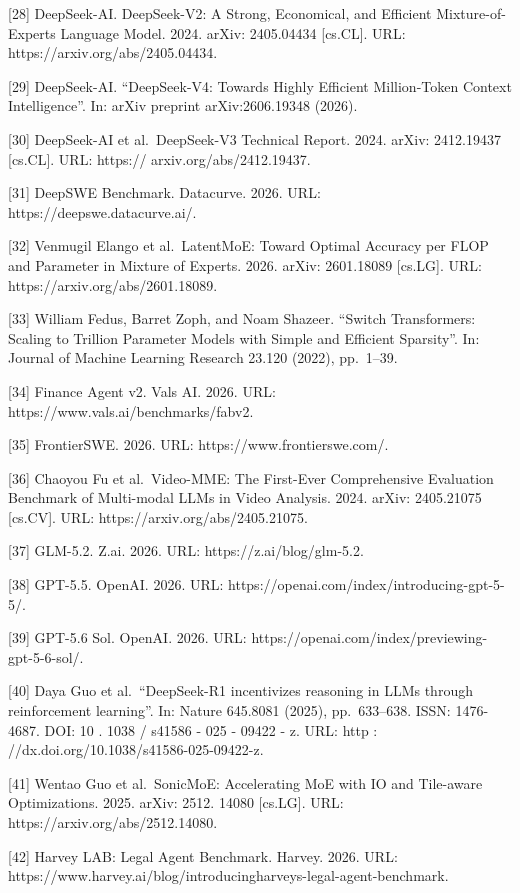 {[}28{]} DeepSeek-AI. DeepSeek-V2: A Strong, Economical, and Efficient
Mixture-of-Experts Language Model. 2024. arXiv: 2405.04434 {[}cs.CL{]}.
URL: https://arxiv.org/abs/2405.04434.

{[}29{]} DeepSeek-AI. ``DeepSeek-V4: Towards Highly Efficient
Million-Token Context Intelligence''. In: arXiv preprint
arXiv:2606.19348 (2026).

{[}30{]} DeepSeek-AI et al.~DeepSeek-V3 Technical Report. 2024. arXiv:
2412.19437 {[}cs.CL{]}. URL: https:// arxiv.org/abs/2412.19437.

{[}31{]} DeepSWE Benchmark. Datacurve. 2026. URL:
https://deepswe.datacurve.ai/.

{[}32{]} Venmugil Elango et al.~LatentMoE: Toward Optimal Accuracy per
FLOP and Parameter in Mixture of Experts. 2026. arXiv: 2601.18089
{[}cs.LG{]}. URL: https://arxiv.org/abs/2601.18089.

{[}33{]} William Fedus, Barret Zoph, and Noam Shazeer. ``Switch
Transformers: Scaling to Trillion Parameter Models with Simple and
Efficient Sparsity''. In: Journal of Machine Learning Research 23.120
(2022), pp.~1--39.

{[}34{]} Finance Agent v2. Vals AI. 2026. URL:
https://www.vals.ai/benchmarks/fabv2.

{[}35{]} FrontierSWE. 2026. URL: https://www.frontierswe.com/.

{[}36{]} Chaoyou Fu et al.~Video-MME: The First-Ever Comprehensive
Evaluation Benchmark of Multi-modal LLMs in Video Analysis. 2024. arXiv:
2405.21075 {[}cs.CV{]}. URL: https://arxiv.org/abs/2405.21075.

{[}37{]} GLM-5.2. Z.ai. 2026. URL: https://z.ai/blog/glm-5.2.

{[}38{]} GPT-5.5. OpenAI. 2026. URL:
https://openai.com/index/introducing-gpt-5-5/.

{[}39{]} GPT-5.6 Sol. OpenAI. 2026. URL:
https://openai.com/index/previewing-gpt-5-6-sol/.

{[}40{]} Daya Guo et al.~``DeepSeek-R1 incentivizes reasoning in LLMs
through reinforcement learning''. In: Nature 645.8081 (2025),
pp.~633--638. ISSN: 1476-4687. DOI: 10 . 1038 / s41586 - 025 - 09422 -
z. URL: http : //dx.doi.org/10.1038/s41586-025-09422-z.

{[}41{]} Wentao Guo et al.~SonicMoE: Accelerating MoE with IO and
Tile-aware Optimizations. 2025. arXiv: 2512. 14080 {[}cs.LG{]}. URL:
https://arxiv.org/abs/2512.14080.

{[}42{]} Harvey LAB: Legal Agent Benchmark. Harvey. 2026. URL:
https://www.harvey.ai/blog/introducingharveys-legal-agent-benchmark.

